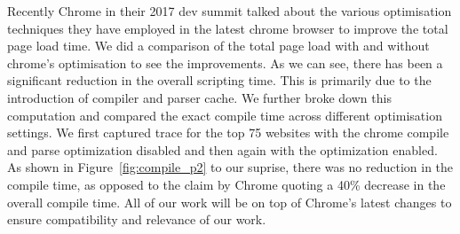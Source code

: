Recently Chrome in their 2017 dev summit talked about the various
optimisation techniques they have employed in the latest chrome
browser to improve the total page load time.  We did a comparison of
the total page load with and without chrome's optimisation to see the
improvements. As we can see, there has been a significant reduction in
the overall scripting time. This is primarily due to the introduction
of compiler and parser cache.  We further broke down this computation
and compared the exact compile time across different optimisation
settings. We first captured trace for the top 75 websites with the
chrome compile and parse optimization disabled and then again with the
optimization enabled. As shown in Figure~\ref{fig:compile_p2} to our
suprise, there was no reduction in the compile time, as opposed to the
claim by Chrome quoting a 40\% decrease in the overall compile time.
All of our work will be on top of Chrome's latest changes to ensure
compatibility and relevance of our work. 
